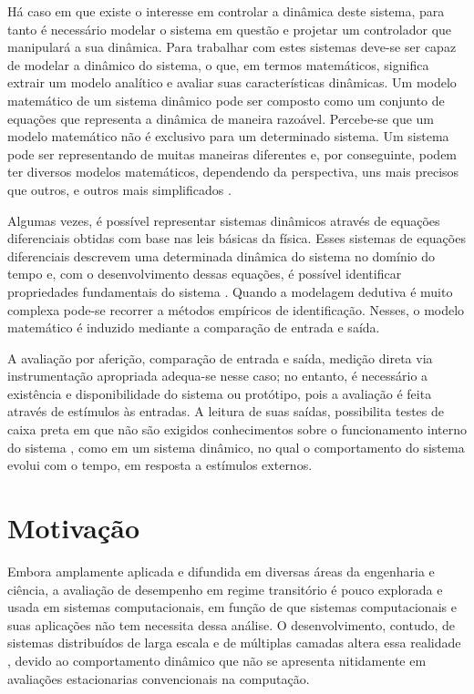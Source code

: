 Há caso em que existe o interesse em controlar a dinâmica deste sistema, para tanto é necessário modelar o sistema em questão e projetar um controlador que manipulará a sua dinâmica. Para trabalhar com estes sistemas deve-se ser capaz de modelar a dinâmico do sistema, o que, em termos matemáticos, significa extrair um modelo analítico e avaliar suas características dinâmicas. Um modelo matemático de um sistema dinâmico pode ser composto como um conjunto de equações que representa a dinâmica de maneira razoável. Percebe-se que um modelo matemático não é exclusivo para um determinado sistema. Um sistema pode ser representando de muitas maneiras diferentes e, por conseguinte, podem ter diversos modelos matemáticos, dependendo da perspectiva, uns mais precisos que outros, e outros mais simplificados \cite{Ogata2001}.

Algumas vezes, é possível representar sistemas dinâmicos através de equações diferenciais obtidas com base nas leis básicas da física. Esses sistemas de equações diferenciais descrevem uma determinada dinâmica do sistema no domínio do tempo e, com o desenvolvimento dessas equações, é possível identificar propriedades fundamentais do sistema \cite{Nobile2013}. Quando a modelagem dedutiva é muito complexa pode-se recorrer a métodos empíricos de identificação. Nesses, o modelo matemático é induzido mediante a comparação de entrada e saída.	

A avaliação por aferição, comparação de entrada e saída, medição direta via instrumentação apropriada adequa-se nesse caso; no entanto, é necessário a existência e disponibilidade do sistema ou protótipo, pois a avaliação é feita através de estímulos às entradas. A leitura de suas saídas, possibilita testes de caixa preta em que não são exigidos conhecimentos sobre o funcionamento interno do sistema \cite{Nobile2013}, como em um sistema dinâmico, no qual o comportamento do sistema evolui com o tempo, em resposta a estímulos externos.

\section{Motivação}

Embora amplamente aplicada e difundida em diversas áreas da engenharia e ciência, a avaliação de desempenho em regime transitório é pouco explorada e usada em sistemas computacionais, em função de que sistemas computacionais e suas aplicações não tem necessita dessa análise. O desenvolvimento, contudo, de sistemas distribuídos de larga escala e de múltiplas camadas altera essa realidade \cite{hpcs2015, Lourenco2015, medc}, devido ao comportamento dinâmico que não se apresenta nitidamente em avaliações estacionarias convencionais na computação. 

